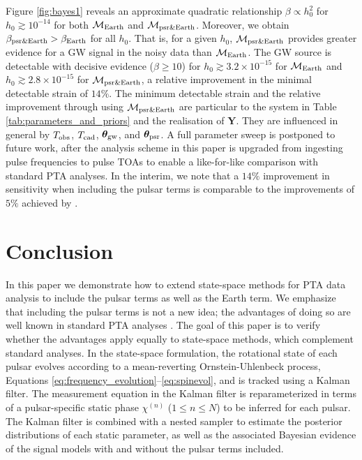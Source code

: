 \documentclass[fleqn,usenatbib,useAMS]{mnras}
\begin{document}
Figure \ref{fig:bayes1} reveals an approximate quadratic relationship $\beta \propto h_0^2$ for $h_0 \gtrsim 10^{-14}$ for both $\mathcal{M}_{\rm Earth}$ and $\mathcal{M}_{\rm psr \& Earth}$. Moreover, we obtain $\beta_{\rm psr \& Earth} > \beta_{\rm Earth}$ for all $h_0$. That is, for a given $h_0$, $\mathcal{M}_{\rm psr \& Earth}$ provides greater evidence for a GW signal in the noisy data than $\mathcal{M}_{\rm Earth}$. The GW source is detectable with decisive evidence ($\beta \geq 10$) for $h_0 \gtrsim 3.2 \times 10^{-15}$ for  $\mathcal{M}_{\rm Earth}$ and $h_0 \gtrsim 2.8 \times 10^{-15}$ for  $\mathcal{M}_{\rm psr \& Earth}$, a relative improvement in the minimal detectable strain of $14\%$. The minimum detectable strain and the relative improvement through using $\mathcal{M}_{\rm psr \& Earth}$ are particular to the system in Table \ref{tab:parameters_and_priors} and the realisation of $\boldsymbol{Y}$. They are influenced in general by $T_{\rm obs}$, $T_{\rm cad}$, ${\boldsymbol{\theta}}_{\rm gw}$, and ${\boldsymbol{\theta}}_{\rm psr}$. A full parameter sweep is postponed to future work, after the analysis scheme in this paper is upgraded from ingesting pulse frequencies to pulse TOAs to enable a like-for-like comparison with standard PTA analyses. In the interim, we note that a $14\%$ improvement in sensitivity when including the pulsar terms is comparable to the improvements of $5\%$ achieved by \cite{Zhupulsarterms}.
		
		
	
		
		
\section{Conclusion}\label{sec:discussion}
In this paper we demonstrate how to extend state-space methods for PTA data analysis to include the pulsar terms as well as the Earth term. We emphasize that including the pulsar terms is not a new idea; the advantages of doing so are well known in standard PTA analyses 
\citep[e.g.][]{Zhupulsarterms,Chen2022,2023ApJ...951L...8A,2023arXiv230616214A,2023ApJ...951L...6R,2023RAA....23g5024X,Arzoumanian2023,2023arXiv230616226A}. The goal of this paper is to verify whether the advantages apply equally to state-space methods, which complement standard analyses. In the state-space formulation, the rotational state of each pulsar evolves according to a mean-reverting Ornstein-Uhlenbeck process, Equations \eqref{eq:frequency_evolution}--\eqref{eq:spinevol}, and is tracked using a Kalman filter. The measurement equation in the Kalman filter is reparameterized in terms of a pulsar-specific static phase $\chi^{(n)}$ ($1 \leq n \leq N$) to be inferred for each pulsar. The Kalman filter is combined with a nested sampler to estimate the posterior distributions of each static parameter, as well as the associated Bayesian evidence of the signal models with and without the pulsar terms included. \newline 
\end{document}
